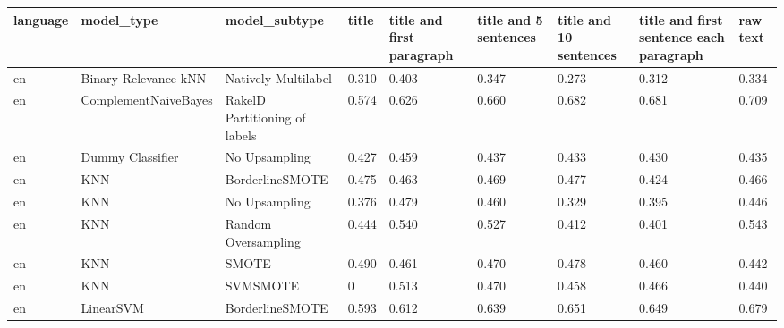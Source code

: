\begin{tabular}{lllllllll}
\toprule
language &                      model\_type &                 model\_subtype & title & title and first paragraph & title and 5 sentences & title and 10 sentences & title and first sentence each paragraph &  raw text \\
\midrule
      en &            Binary Relevance kNN &           Natively Multilabel & 0.310 &                     0.403 &                 0.347 &                  0.273 &                                   0.312 &     0.334 \\
      en &            ComplementNaiveBayes & RakelD Partitioning of labels & 0.574 &                     0.626 &                 0.660 &                  0.682 &                                   0.681 &     0.709 \\
      en &                Dummy Classifier &                 No Upsampling & 0.427 &                     0.459 &                 0.437 &                  0.433 &                                   0.430 &     0.435 \\
      en &                             KNN &               BorderlineSMOTE & 0.475 &                     0.463 &                 0.469 &                  0.477 &                                   0.424 &     0.466 \\
      en &                             KNN &                 No Upsampling & 0.376 &                     0.479 &                 0.460 &                  0.329 &                                   0.395 &     0.446 \\
      en &                             KNN &           Random Oversampling & 0.444 &                     0.540 &                 0.527 &                  0.412 &                                   0.401 &     0.543 \\
      en &                             KNN &                         SMOTE & 0.490 &                     0.461 &                 0.470 &                  0.478 &                                   0.460 &     0.442 \\
      en &                             KNN &                      SVMSMOTE &     0 &                     0.513 &                 0.470 &                  0.458 &                                   0.466 &     0.440 \\
      en &                       LinearSVM &               BorderlineSMOTE & 0.593 &                     0.612 &                 0.639 &                  0.651 &                                   0.649 &     0.679 \\

\end{tabular}
